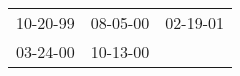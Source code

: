 \begin{supertabular}{lll}
 10-20-99\textsuperscript{} &  08-05-00\textsuperscript{} &  02-19-01\textsuperscript{} \\
 03-24-00\textsuperscript{} &  10-13-00\textsuperscript{} &                             \\
\end{supertabular}
